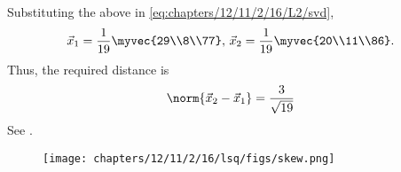         Substituting the above in \eqref{eq:chapters/12/11/2/16/L2/svd},
    \begin{align}
        \vec{x}_1 = \frac{1}{19}\myvec{29\\8\\77},\, \vec{x}_2 = \frac{1}{19}\myvec{20\\11\\86}.
    \end{align}
    Thus, the required distance is
    \begin{align}
        \norm{\vec{x}_2-\vec{x}_1} = \frac{3}{\sqrt{19}}
    \end{align}
See .
    \begin{figure}[H]
        \centering
        \texttt{[image: chapters/12/11/2/16/lsq/figs/skew.png]}
        \caption{}
        \label{fig:chapters/12/11/2/16/skew}
    \end{figure}
